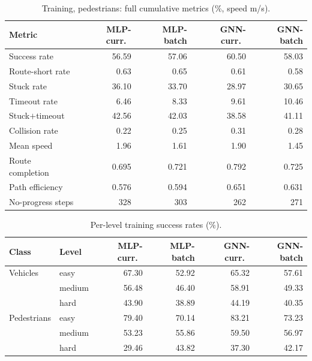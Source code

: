 \begin{table}[h]
  \centering\small
  \caption{Training, pedestrians: full cumulative metrics (\%, speed
  m/s).}
  \begin{tabular}{@{}lrrrr@{}}
    \toprule
    Metric & MLP-curr.\ & MLP-batch & GNN-curr.\ & GNN-batch \\
    \midrule
    Success rate & 56.59 & 57.06 & 60.50 & 58.03 \\
    Route-short rate & 0.63 & 0.65 & 0.61 & 0.58 \\
    Stuck rate & 36.10 & 33.70 & 28.97 & 30.65 \\
    Timeout rate & 6.46 & 8.33 & 9.61 & 10.46 \\
    Stuck$+$timeout & 42.56 & 42.03 & 38.58 & 41.11 \\
    Collision rate & 0.22 & 0.25 & 0.31 & 0.28 \\
    Mean speed & 1.96 & 1.61 & 1.90 & 1.45 \\
    Route completion & 0.695 & 0.721 & 0.792 & 0.725 \\
    Path efficiency & 0.576 & 0.594 & 0.651 & 0.631 \\
    No-progress steps & 328 & 303 & 262 & 271 \\
    \bottomrule
  \end{tabular}
\end{table}

\begin{table}[h]
  \centering\small
  \caption{Per-level training success rates (\%).}
  \begin{tabular}{@{}llrrrr@{}}
    \toprule
    Class & Level & MLP-curr.\ & MLP-batch & GNN-curr.\ & GNN-batch \\
    \midrule
    Vehicles & easy & 67.30 & 52.92 & 65.32 & 57.61 \\
             & medium & 56.48 & 46.40 & 58.91 & 49.33 \\
             & hard & 43.90 & 38.89 & 44.19 & 40.35 \\
    \addlinespace
    Pedestrians & easy & 79.40 & 70.14 & 83.21 & 73.23 \\
             & medium & 53.23 & 55.86 & 59.50 & 56.97 \\
             & hard & 29.46 & 43.82 & 37.30 & 42.17 \\
    \bottomrule
  \end{tabular}
\end{table}

